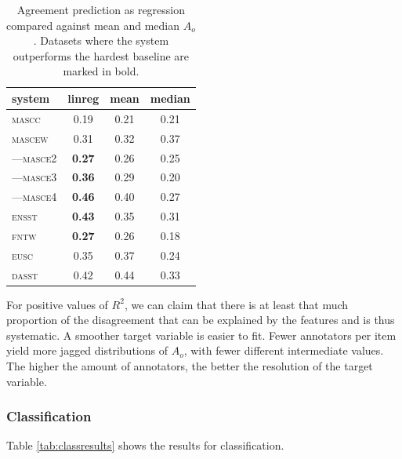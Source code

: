\documentclass[11pt,a4paper]{article}
\begin{document}
\begin{table}[Ht!]

\begin{center}
  \begin{tabular}{lc|cc}
 \toprule
system & linreg & mean & median \\
 \midrule
 \textsc{mascc} & 0.19 & 0.21 & 0.21 \\
 \textsc{mascew} & 0.31 & 0.32 & 0.37 \\
---\textsc{masce2} & \textbf{0.27} & 0.26 & 0.25 \\
---\textsc{masce3} &\textbf{ 0.36} & 0.29 & 0.20 \\
---\textsc{masce4} & \textbf{0.46} & 0.40 & 0.27 \\
\textsc{ensst} & \textbf{0.43} & 0.35 & 0.31 \\
\textsc{fntw} & \textbf{0.27} & 0.26 & 0.18 \\

\textsc{eusc} & 0.35 & 0.37 & 0.24 \\
\textsc{dasst} & 0.42 & 0.44 & 0.33 \\

\bottomrule

  \end{tabular}  
\end{center}
\caption{Agreement prediction as regression compared against mean and median $A_o$. Datasets where the system outperforms the hardest baseline are marked in bold. \label{tab:regagr_results}}
\end{table} 

For positive values of $R^2$, we can claim that there is at least that much proportion of the disagreement that can be explained by the features and is thus systematic. A smoother target variable is easier to fit. Fewer annotators per item yield more jagged distributions of $A_o$, with fewer different intermediate values. The higher the amount of annotators, the better the resolution of the target variable. 

\subsubsection{Classification}
Table \ref{tab:classresults} shows the results for classification.
\end{document}
